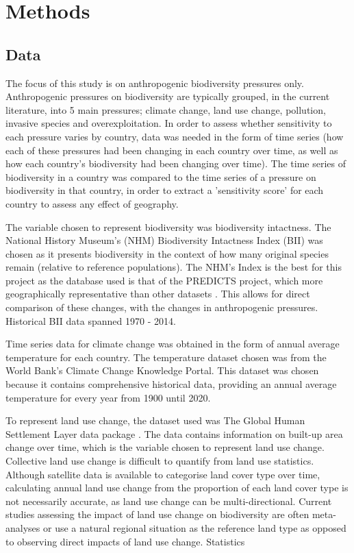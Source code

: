 \documentclass[11pt, a4paper, titlepage]{article}
\begin{document}
    \section*{Methods}


	\subsection*{Data}
	
	The focus of this study is on anthropogenic biodiversity pressures only. Anthropogenic pressures on biodiversity are typically grouped, in the current literature, into 5 main pressures; climate change, land use change, pollution, invasive species and overexploitation. In order to assess whether sensitivity to each pressure varies by country, data was needed in the form of time series (how each of these pressures had been changing in each country over time, as well as how each country's biodiversity had been changing over time). The time series of biodiversity in a country was compared to the time series of a pressure on biodiversity in that country, in order to extract a 'sensitivity score' for each country to assess any effect of geography. \newline
	
	The variable chosen to represent biodiversity was biodiversity intactness. The National History Museum's (NHM) Biodiversity Intactness Index (BII) was chosen as it presents biodiversity in the context of how many original species remain (relative to reference populations). The NHM's Index is the best for this project as the database used is that of the PREDICTS project, which more geographically representative than other datasets \cite{purvis2018modelling}. This allows for direct comparison of these changes, with the changes in anthropogenic pressures. Historical BII data spanned 1970 - 2014. \newline
	
	Time series data for climate change was obtained in the form of annual average temperature for each country. The temperature dataset chosen was from the World Bank's Climate Change Knowledge Portal. This dataset was chosen because it contains comprehensive historical data, providing an annual average temperature for every year from 1900 until 2020. \newline
	
	To represent land use change, the dataset used was The Global Human Settlement Layer data package \cite{JRC117104}. The data contains information on built-up area change over time, which is the variable chosen to represent land use change. Collective land use change is difficult to quantify from land use statistics. Although satellite data is available to categorise land cover type over time, calculating annual land use change from the proportion of each land cover type is not necessarily accurate, as land use change can be multi-directional. Current studies assessing the impact of land use change on biodiversity are often meta-analyses or use a natural regional situation as the reference land type \cite{de2013land} as opposed to observing direct impacts of land use change. Statistics \newline
	
\end{document}
